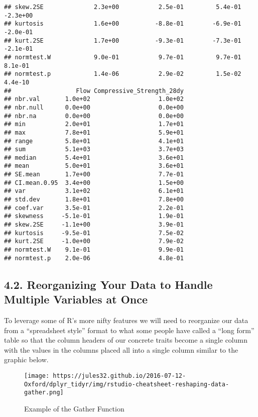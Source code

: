\documentclass[]{article}
\begin{document}
\begin{verbatim}
## skew.2SE              2.3e+00           2.5e-01         5.4e-01 -2.3e+00
## kurtosis              1.6e+00          -8.8e-01        -6.9e-01 -2.0e-01
## kurt.2SE              1.7e+00          -9.3e-01        -7.3e-01 -2.1e-01
## normtest.W            9.0e-01           9.7e-01         9.7e-01  8.1e-01
## normtest.p            1.4e-06           2.9e-02         1.5e-02  4.4e-10
##                  Flow Compressive_Strength_28dy
## nbr.val       1.0e+02                   1.0e+02
## nbr.null      0.0e+00                   0.0e+00
## nbr.na        0.0e+00                   0.0e+00
## min           2.0e+01                   1.7e+01
## max           7.8e+01                   5.9e+01
## range         5.8e+01                   4.1e+01
## sum           5.1e+03                   3.7e+03
## median        5.4e+01                   3.6e+01
## mean          5.0e+01                   3.6e+01
## SE.mean       1.7e+00                   7.7e-01
## CI.mean.0.95  3.4e+00                   1.5e+00
## var           3.1e+02                   6.1e+01
## std.dev       1.8e+01                   7.8e+00
## coef.var      3.5e-01                   2.2e-01
## skewness     -5.1e-01                   1.9e-01
## skew.2SE     -1.1e+00                   3.9e-01
## kurtosis     -9.5e-01                   7.5e-02
## kurt.2SE     -1.0e+00                   7.9e-02
## normtest.W    9.1e-01                   9.9e-01
## normtest.p    2.0e-06                   4.8e-01
\end{verbatim}

\hypertarget{reorganizing-your-data-to-handle-multiple-variables-at-once}{%
\subsection{4.2. Reorganizing Your Data to Handle Multiple Variables at
Once}\label{reorganizing-your-data-to-handle-multiple-variables-at-once}}

To leverage some of R's more nifty features we will need to reorganize
our data from a ``spreadsheet style'' format to what some people have
called a ``long form'' table so that the column headers of our concrete
traits become a single column with the values in the columns placed all
into a single column similar to the graphic below.

\begin{figure}
\centering
\texttt{[image: https://jules32.github.io/2016-07-12-Oxford/dplyr\_tidyr/img/rstudio-cheatsheet-reshaping-data-gather.png]}
\caption{Example of the Gather Function}
\end{figure}
\end{document}
